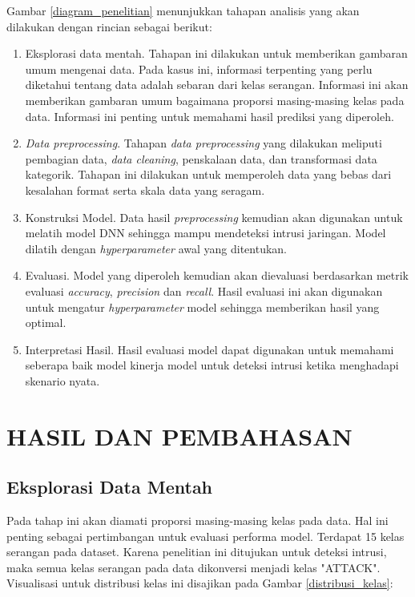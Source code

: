 \documentclass[a4paper,12pt]{report}
\begin{document}
Gambar \ref{diagram_penelitian} menunjukkan tahapan analisis yang akan dilakukan dengan rincian sebagai berikut:
\begin{enumerate}
	\item Eksplorasi data mentah. Tahapan ini dilakukan untuk memberikan gambaran umum mengenai data. Pada kasus ini, informasi terpenting yang perlu diketahui tentang data adalah sebaran dari kelas serangan. Informasi ini akan memberikan gambaran umum bagaimana proporsi masing-masing kelas pada data. Informasi ini penting untuk memahami hasil prediksi yang diperoleh.
	
	\item \textit{Data preprocessing}. Tahapan \textit{data preprocessing} yang dilakukan meliputi pembagian data, \textit{data cleaning}, penskalaan data, dan transformasi data kategorik. Tahapan ini dilakukan untuk memperoleh data yang bebas dari kesalahan format serta skala data yang seragam.
	
	\item Konstruksi Model. Data hasil \textit{preprocessing} kemudian akan digunakan untuk melatih model DNN sehingga mampu mendeteksi intrusi jaringan. Model dilatih dengan \textit{hyperparameter} awal yang ditentukan.
	
	\item Evaluasi. Model yang diperoleh kemudian akan dievaluasi berdasarkan metrik evaluasi \textit{accuracy}, \textit{precision} dan \textit{recall}. Hasil evaluasi ini akan digunakan untuk mengatur \textit{hyperparameter} model sehingga memberikan hasil yang optimal.
	
	\item Interpretasi Hasil. Hasil evaluasi model dapat digunakan untuk memahami seberapa baik model kinerja model untuk deteksi intrusi ketika menghadapi skenario nyata.
\end{enumerate}

\chapter{HASIL DAN PEMBAHASAN}
\section{Eksplorasi Data Mentah}
Pada tahap ini akan diamati proporsi masing-masing kelas pada data. Hal ini penting sebagai pertimbangan untuk evaluasi performa model. Terdapat 15 kelas serangan pada dataset. Karena penelitian ini ditujukan untuk deteksi intrusi, maka semua kelas serangan pada data dikonversi menjadi kelas "ATTACK". Visualisasi untuk distribusi kelas ini disajikan pada Gambar \ref{distribusi_kelas}:
\end{document}
